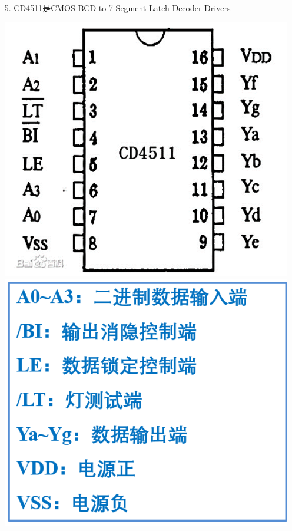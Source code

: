 \documentclass[UTF8]{ctexart}
\begin{document}
\begin{enumerate}
\begin{itemize}
\begin{center}
                        \label{fig:label}
                    \end{center}
              \item [5.] CD4511是CMOS BCD-to-7-Segment Latch Decoder Drivers\\
                    \begin{center}
                        \includegraphics[scale = 0.5]{5.png}
                        \label{fig:label}
                        \includegraphics[scale = 0.5]{6.png}

\end{center}
\end{itemize}
\end{enumerate}
\end{document}
